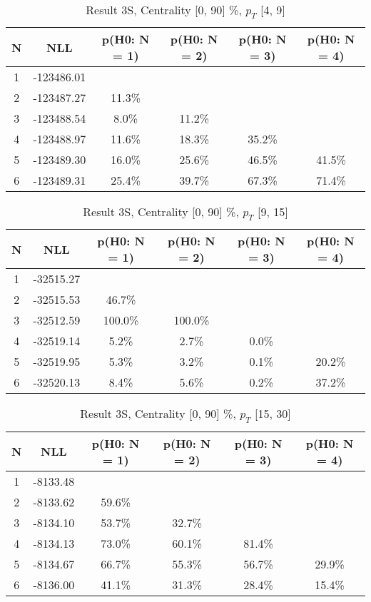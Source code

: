 \begin{table}[htb]
	\begin{center}
	\caption{Result 3S, Centrality [0, 90] \%, $p_{T}$ [4, 9] \GeV
}
{\footnotesize\renewcommand{\arraystretch}{1.4}
		\begin{tabular}{cc||cccc}
			N & NLL & p(H0: N = 1) & p(H0: N = 2) & p(H0: N = 3) & p(H0: N = 4)\\ 
		\hline
1 & -123486.01 & & & & \\
2 & -123487.27 & 11.3\% & & & \\
3 & -123488.54 & 8.0\% & 11.2\% & & \\
4 & -123488.97 & 11.6\% & 18.3\% & 35.2\% & \\
5 & -123489.30 & 16.0\% & 25.6\% & 46.5\% & 41.5\% \\
6 & -123489.31 & 25.4\% & 39.7\% & 67.3\% & 71.4\% \\
	\end{tabular}
		\label{tab:lab}
	}
	\end{center}\end{table}

\begin{table}[htb]
	\begin{center}
	\caption{Result 3S, Centrality [0, 90] \%, $p_{T}$ [9, 15] \GeV
}
{\footnotesize\renewcommand{\arraystretch}{1.4}
		\begin{tabular}{cc||cccc}
			N & NLL & p(H0: N = 1) & p(H0: N = 2) & p(H0: N = 3) & p(H0: N = 4)\\ 
		\hline
1 & -32515.27 & & & & \\
2 & -32515.53 & 46.7\% & & & \\
3 & -32512.59 & 100.0\% & 100.0\% & & \\
4 & -32519.14 & 5.2\% & 2.7\% & 0.0\% & \\
5 & -32519.95 & 5.3\% & 3.2\% & 0.1\% & 20.2\% \\
6 & -32520.13 & 8.4\% & 5.6\% & 0.2\% & 37.2\% \\
	\end{tabular}
		\label{tab:lab}
	}
	\end{center}\end{table}

\begin{table}[htb]
	\begin{center}
	\caption{Result 3S, Centrality [0, 90] \%, $p_{T}$ [15, 30] \GeV
}
{\footnotesize\renewcommand{\arraystretch}{1.4}
		\begin{tabular}{cc||cccc}
			N & NLL & p(H0: N = 1) & p(H0: N = 2) & p(H0: N = 3) & p(H0: N = 4)\\ 
		\hline
1 & -8133.48 & & & & \\
2 & -8133.62 & 59.6\% & & & \\
3 & -8134.10 & 53.7\% & 32.7\% & & \\
4 & -8134.13 & 73.0\% & 60.1\% & 81.4\% & \\
5 & -8134.67 & 66.7\% & 55.3\% & 56.7\% & 29.9\% \\
6 & -8136.00 & 41.1\% & 31.3\% & 28.4\% & 15.4\% \\
	\end{tabular}
		\label{tab:lab}
	}
	\end{center}\end{table}

